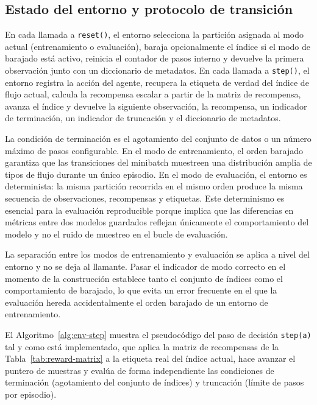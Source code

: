 \subsection{Estado del entorno y protocolo de transición}
En cada llamada a \texttt{reset()}, el entorno selecciona la partición asignada al modo actual (entrenamiento o evaluación), baraja opcionalmente el índice si el modo de barajado está activo, reinicia el contador de pasos interno y devuelve la primera observación junto con un diccionario de metadatos. En cada llamada a \texttt{step()}, el entorno registra la acción del agente, recupera la etiqueta de verdad del índice de flujo actual, calcula la recompensa escalar a partir de la matriz de recompensa, avanza el índice y devuelve la siguiente observación, la recompensa, un indicador de terminación, un indicador de truncación y el diccionario de metadatos.

La condición de terminación es el agotamiento del conjunto de datos o un número máximo de pasos configurable. En el modo de entrenamiento, el orden barajado garantiza que las transiciones del minibatch muestreen una distribución amplia de tipos de flujo durante un único episodio. En el modo de evaluación, el entorno es determinista: la misma partición recorrida en el mismo orden produce la misma secuencia de observaciones, recompensas y etiquetas. Este determinismo es esencial para la evaluación reproducible porque implica que las diferencias en métricas entre dos modelos guardados reflejan únicamente el comportamiento del modelo y no el ruido de muestreo en el bucle de evaluación.

La separación entre los modos de entrenamiento y evaluación se aplica a nivel del entorno y no se deja al llamante. Pasar el indicador de modo correcto en el momento de la construcción establece tanto el conjunto de índices como el comportamiento de barajado, lo que evita un error frecuente en el que la evaluación hereda accidentalmente el orden barajado de un entorno de entrenamiento.

El Algoritmo~\ref{alg:env-step} muestra el pseudocódigo del paso de decisión \texttt{step(a)} tal y como está implementado, que aplica la matriz de recompensas de la Tabla~\ref{tab:reward-matrix} a la etiqueta real del índice actual, hace avanzar el puntero de muestras y evalúa de forma independiente las condiciones de terminación (agotamiento del conjunto de índices) y truncación (límite de pasos por episodio).

